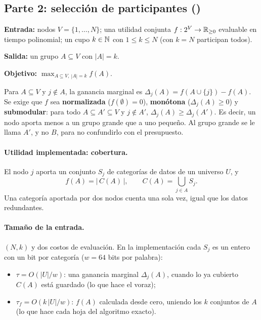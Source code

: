 \subsection{Parte 2: selección de participantes (\SEL)}

\begin{definicion}
\textbf{Entrada:} nodos $V=\{1,\dots,N\}$; una utilidad conjunta $f:2^V\to\mathbb{R}_{\ge0}$ evaluable en
tiempo polinomial; un cupo $k\in\mathbb{N}$ con $1\le k\le N$ (con $k=N$ participan todos).

\textbf{Salida:} un grupo $A\subseteq V$ con $|A|=k$.

\textbf{Objetivo:} $\max_{A\subseteq V,\ |A|=k} f(A)$.
\end{definicion}

Para $A\subseteq V$ y $j\notin A$, la ganancia marginal es $\Delta_j(A)=f(A\cup\{j\})-f(A)$. Se exige
que $f$ sea \textbf{normalizada} ($f(\emptyset)=0$), \textbf{monótona} ($\Delta_j(A)\ge0$) y
\textbf{submodular}: para todo $A\subseteq A'\subseteq V$ y $j\notin A'$, $\Delta_j(A)\ge\Delta_j(A')$.
Es decir, un nodo aporta menos a un grupo grande que a uno pequeño. Al grupo grande se le llama
$A'$, y no $B$, para no confundirlo con el presupuesto.

\paragraph{Utilidad implementada: cobertura.} El nodo $j$ aporta un conjunto $S_j$ de categorías de
datos de un universo $U$, y
\[
  f(A)=\Big|\,C(A)\,\Big|,\qquad C(A)=\bigcup_{j\in A} S_j .
\]
Una categoría aportada por dos nodos cuenta una sola vez, igual que los datos redundantes.

\paragraph{Tamaño de la entrada.} $(N,k)$ y dos costos de evaluación. En la implementación cada
$S_j$ es un entero con un bit por categoría ($w=64$ bits por palabra):
\begin{itemize}
  \item $\tau=O(|U|/w)$: una ganancia marginal $\Delta_j(A)$, cuando lo ya cubierto $C(A)$ está
  guardado (lo que hace el voraz);
  \item $\tau_f=O(k\,|U|/w)$: $f(A)$ calculada desde cero, uniendo los $k$ conjuntos de $A$ (lo que
  hace cada hoja del algoritmo exacto).
\end{itemize}

